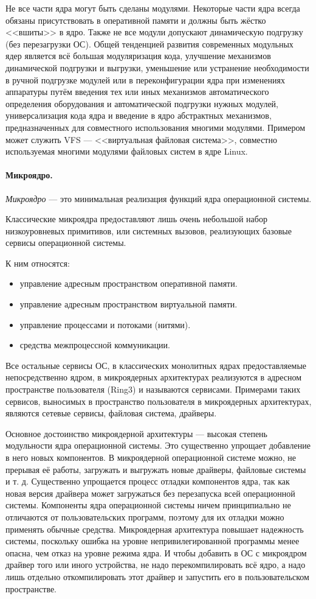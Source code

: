 Не все части ядра могут быть сделаны модулями. Некоторые части ядра всегда обязаны присутствовать в оперативной памяти и должны быть жёстко <<вшиты>> в ядро. Также не все модули допускают динамическую подгрузку (без перезагрузки ОС).
Общей тенденцией развития современных модульных ядер является всё большая модуляризация кода, улучшение механизмов динамической подгрузки и выгрузки, уменьшение или устранение необходимости в ручной подгрузке модулей или в переконфигурации ядра при изменениях аппаратуры путём введения тех или иных механизмов автоматического определения оборудования и автоматической подгрузки нужных модулей, универсализация кода ядра и введение в ядро абстрактных механизмов, предназначенных для совместного использования многими модулями. Примером может служить VFS --- <<виртуальная файловая система>>, совместно используемая многими модулями файловых систем в ядре Linux.

\paragraph{Микроядро.} \emph{Микроядро} --- это минимальная реализация функций ядра операционной системы.

Классические микроядра предоставляют лишь очень небольшой набор низкоуровневых примитивов, или системных вызовов, реализующих базовые сервисы операционной системы.

К ним относятся:
\begin{itemize}
 \item управление адресным пространством оперативной памяти.
 \item управление адресным пространством виртуальной памяти.
 \item управление процессами и потоками (нитями).
 \item средства межпроцессной коммуникации.
\end{itemize}

Все остальные сервисы ОС, в классических монолитных ядрах предоставляемые непосредственно ядром, в микроядерных архитектурах реализуются в адресном пространстве пользователя (Ring3) и называются сервисами. Примерами таких сервисов, выносимых в пространство пользователя в микроядерных архитектурах, являются сетевые сервисы, файловая система, драйверы.

Основное достоинство микроядерной архитектуры --- высокая степень модульности ядра операционной системы. Это существенно упрощает добавление в него новых компонентов. В микроядерной операционной системе можно, не прерывая её работы, загружать и выгружать новые драйверы, файловые системы и т. д. Существенно упрощается процесс отладки компонентов ядра, так как новая версия драйвера может загружаться без перезапуска всей операционной системы.
Компоненты ядра операционной системы ничем принципиально не отличаются от пользовательских программ, поэтому для их отладки можно применять обычные средства. Микроядерная архитектура повышает надежность системы, поскольку ошибка на уровне непривилегированной программы менее опасна, чем отказ на уровне режима ядра. И чтобы добавить в ОС с микроядром драйвер того или иного устройства, не надо перекомпилировать всё ядро, а надо лишь отдельно откомпилировать этот драйвер и запустить его в пользовательском пространстве.

